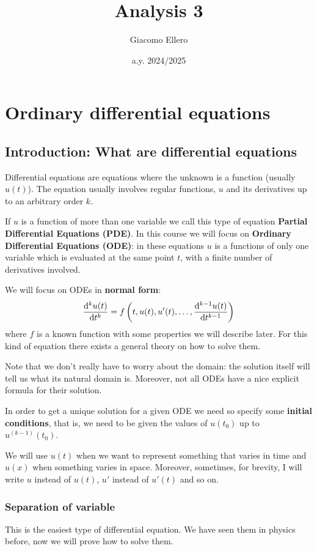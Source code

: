 \documentclass[12pt]{extarticle}
\title{Analysis 3}
\author{Giacomo Ellero}
\date{a.y. 2024/2025}
\begin{document}
\firstpage

\section{Ordinary differential equations}

\subsection{Introduction: What are differential equations}

Differential equations are equations where the unknown is a function (usually $u(t)$).
The equation usually involves regular functions, $u$ and its derivatives up to an arbitrary order $k$.

If $u$ is a function of more than one variable we call this type of equation \textbf{Partial Differential Equations (PDE)}.
In this course we will focus on \textbf{Ordinary Differential Equations (ODE)}:
in these equations $u$ is a functions of only one variable which is evaluated at the same point $t$, with a finite number of derivatives involved.

We will focus on ODEs in \textbf{normal form}:
\begin{equation}
	\label{eq:normal-form}
	\dv[k]{u(t)}{t} = f\left( t, u(t), u'(t), \dots, \dv[k-1]{u(t)}{t} \right)
\end{equation}
where $f$ is a known function with some properties we will describe later.
For this kind of equation there exists a general theory on how to solve them.

Note that we don't really have to worry about the domain: the solution itself will tell us what its natural domain is.
Moreover, not all ODEs have a nice explicit formula for their solution.

In order to get a unique solution for a given ODE we need so specify some \textbf{initial conditions}, that is, we need to be given the values of $u(t_0)$ up to $u^{(k-1)}(t_0)$.

We will use $u(t)$ when we want to represent something that varies in time and $u(x)$ when something varies in space.
Moreover, sometimes, for brevity, I will write $u$ instead of $u(t)$, $u'$ instead of $u'(t)$ and so on.

\subsubsection{Separation of variable}

This is the easiest type of differential equation. We have seen them in physics before, now we will prove how to solve them.
\end{document}
